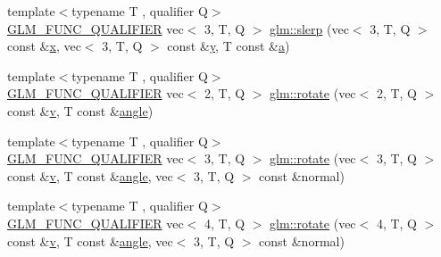 \begin{DoxyCompactItemize}
\item 
{\footnotesize template$<$typename T , qualifier Q$>$ }\\\mbox{\hyperlink{setup_8hpp_a33fdea6f91c5f834105f7415e2a64407}{G\+L\+M\+\_\+\+F\+U\+N\+C\+\_\+\+Q\+U\+A\+L\+I\+F\+I\+ER}} vec$<$ 3, T, Q $>$ \mbox{\hyperlink{group__gtx__rotate__vector_ga8b11b18ce824174ea1a5a69ea14e2cee}{glm\+::slerp}} (vec$<$ 3, T, Q $>$ const \&\mbox{\hyperlink{_s_d_l__opengl_8h_ad0e63d0edcdbd3d79554076bf309fd47}{x}}, vec$<$ 3, T, Q $>$ const \&\mbox{\hyperlink{_s_d_l__opengl_8h_a1675d9d7bb68e1657ff028643b4037e3}{y}}, T const \&\mbox{\hyperlink{_s_d_l__opengl__glext_8h_a3309789fc188587d666cda5ece79cf82}{a}})
\item 
{\footnotesize template$<$typename T , qualifier Q$>$ }\\\mbox{\hyperlink{setup_8hpp_a33fdea6f91c5f834105f7415e2a64407}{G\+L\+M\+\_\+\+F\+U\+N\+C\+\_\+\+Q\+U\+A\+L\+I\+F\+I\+ER}} vec$<$ 2, T, Q $>$ \mbox{\hyperlink{group__gtx__rotate__vector_gab64a67b52ff4f86c3ba16595a5a25af6}{glm\+::rotate}} (vec$<$ 2, T, Q $>$ const \&\mbox{\hyperlink{_s_d_l__opengl_8h_a10a82eabcb59d2fcd74acee063775f90}{v}}, T const \&\mbox{\hyperlink{_s_d_l__opengl__glext_8h_a9e06c1f76a20fed54ca742cd25cb02c4}{angle}})
\item 
{\footnotesize template$<$typename T , qualifier Q$>$ }\\\mbox{\hyperlink{setup_8hpp_a33fdea6f91c5f834105f7415e2a64407}{G\+L\+M\+\_\+\+F\+U\+N\+C\+\_\+\+Q\+U\+A\+L\+I\+F\+I\+ER}} vec$<$ 3, T, Q $>$ \mbox{\hyperlink{group__gtx__rotate__vector_ga1ba501ef83d1a009a17ac774cc560f21}{glm\+::rotate}} (vec$<$ 3, T, Q $>$ const \&\mbox{\hyperlink{_s_d_l__opengl_8h_a10a82eabcb59d2fcd74acee063775f90}{v}}, T const \&\mbox{\hyperlink{_s_d_l__opengl__glext_8h_a9e06c1f76a20fed54ca742cd25cb02c4}{angle}}, vec$<$ 3, T, Q $>$ const \&normal)
\item 
{\footnotesize template$<$typename T , qualifier Q$>$ }\\\mbox{\hyperlink{setup_8hpp_a33fdea6f91c5f834105f7415e2a64407}{G\+L\+M\+\_\+\+F\+U\+N\+C\+\_\+\+Q\+U\+A\+L\+I\+F\+I\+ER}} vec$<$ 4, T, Q $>$ \mbox{\hyperlink{group__gtx__rotate__vector_ga1005f1267ed9c57faa3f24cf6873b961}{glm\+::rotate}} (vec$<$ 4, T, Q $>$ const \&\mbox{\hyperlink{_s_d_l__opengl_8h_a10a82eabcb59d2fcd74acee063775f90}{v}}, T const \&\mbox{\hyperlink{_s_d_l__opengl__glext_8h_a9e06c1f76a20fed54ca742cd25cb02c4}{angle}}, vec$<$ 3, T, Q $>$ const \&normal)
\item 

\end{DoxyCompactItemize}
